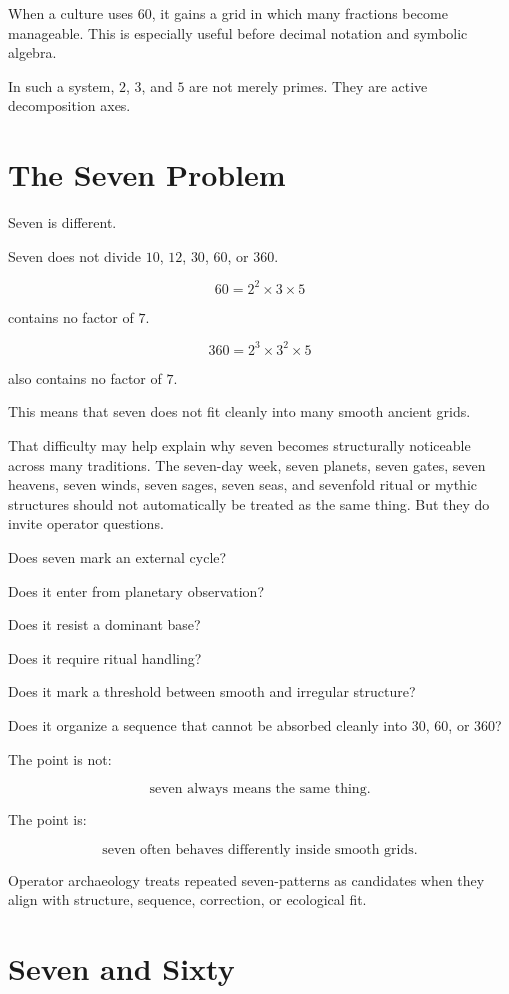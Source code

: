 \documentclass[11pt]{book}
\begin{document}
When a culture uses \(60\), it gains a grid in which many fractions become manageable. This is especially useful before decimal notation and symbolic algebra.

In such a system, \(2\), \(3\), and \(5\) are not merely primes. They are active decomposition axes.

\section{The Seven Problem}

Seven is different.

Seven does not divide \(10\), \(12\), \(30\), \(60\), or \(360\).

\[
60 = 2^2 \times 3 \times 5
\]

contains no factor of \(7\).

\[
360 = 2^3 \times 3^2 \times 5
\]

also contains no factor of \(7\).

This means that seven does not fit cleanly into many smooth ancient grids.

That difficulty may help explain why seven becomes structurally noticeable across many traditions. The seven-day week, seven planets, seven gates, seven heavens, seven winds, seven sages, seven seas, and sevenfold ritual or mythic structures should not automatically be treated as the same thing. But they do invite operator questions.

Does seven mark an external cycle?

Does it enter from planetary observation?

Does it resist a dominant base?

Does it require ritual handling?

Does it mark a threshold between smooth and irregular structure?

Does it organize a sequence that cannot be absorbed cleanly into \(30\), \(60\), or \(360\)?

The point is not:

\[
\text{seven always means the same thing}.
\]

The point is:

\[
\text{seven often behaves differently inside smooth grids}.
\]

Operator archaeology treats repeated seven-patterns as candidates when they align with structure, sequence, correction, or ecological fit.

\section{Seven and Sixty}
\end{document}
